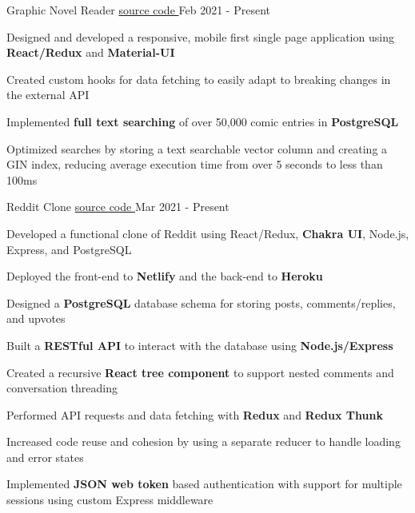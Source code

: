 
\begin{cventries}
  \cventry
    {\fontsize{10pt}{1em}\bodyfont\upshape\color{text}{Front-end comic reading client for the MangaDex API}} %
    {Graphic Novel Reader} %
    {\href{https://github.com/tacticaltofu/mangastack}{source code \faExternalLink}} %
    {Feb 2021 - Present} %
    {
      \begin{cvitems} %
        \item {Designed and developed a responsive, mobile first single page application using \textbf{React/Redux} and \textbf{Material-UI}}
        \item {Created custom hooks for data fetching to easily adapt to breaking changes in the external API}
        \item {Implemented \textbf{full text searching} of over 50,000 comic entries in \textbf{PostgreSQL}}
        \item {Optimized searches by storing a text searchable vector column and creating a GIN index, reducing average execution time from over 5 seconds to less than 100ms}
      \end{cvitems}
    }
    
  \cventry
    {\fontsize{10pt}{1em}\bodyfont\upshape\color{text}{News aggregation and discussion website very similar to Reddit}} %
    {Reddit Clone} %
    {\href{https://github.com/tacticaltofu/reddit-clone}{source code \faExternalLink}} %
    {Mar 2021 - Present} %
    {
      \begin{cvitems} %
        \item {Developed a functional clone of Reddit using React/Redux, \textbf{Chakra UI}, Node.js, Express, and PostgreSQL}
        \item {Deployed the front-end to \textbf{Netlify} and the back-end to \textbf{Heroku} }
        \item {Designed a \textbf{PostgreSQL} database schema for storing posts, comments/replies, and upvotes}
        \item {Built a \textbf{RESTful API} to interact with the database using \textbf{Node.js/Express}}
        \item {Created a recursive \textbf{React tree component} to support nested comments and conversation threading}
        \item {Performed API requests and data fetching with \textbf{Redux} and \textbf{Redux Thunk}}
        \item {Increased code reuse and cohesion by using a separate reducer to handle loading and error states}
        \item {Implemented \textbf{JSON web token} based authentication with support for multiple sessions using custom Express middleware}
      \end{cvitems}
    }
\end{cventries}